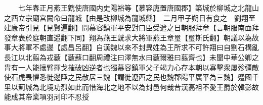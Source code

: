 　　七年春正月燕王皝使唐國内史陽裕等【慕容廆置唐國郡】築城於柳城之北龍山之西立宗廟宫闕命曰龍城【由是改柳城為龍城縣】　二月甲子朔日有食之　劉翔至建康帝引見【見賢遍翻】問慕容鎮軍平安對曰臣受遣之日朝服拜章【言朝服南面拜發章表於庭朝直遥翻下同】翔為燕王皝求大將軍燕王章璽【璽斯氏翻】朝議以為故事大將軍不處邊【處昌呂翻】自漢魏以來不封異姓為王所求不可許翔曰自劉石構亂長江以北翦為戎藪【藪蘇口翻周禮注曰澤無水曰藪爾雅曰翦齊也】未聞中華公卿之胄有一人能攘臂揮戈摧破凶逆者也獨慕容鎮軍父子竭力心存本朝以寡擊衆屢殄彊敵使石虎畏懼悉徙邊陲之民散居三魏【謂徙遼西之民也魏郡陽平廣平為三魏】蹙國千里以薊城為北境功烈如此而惜海北之地不以為封邑何哉昔漢高祖不愛王爵於韓彭故能成其帝業項羽刓印不忍授